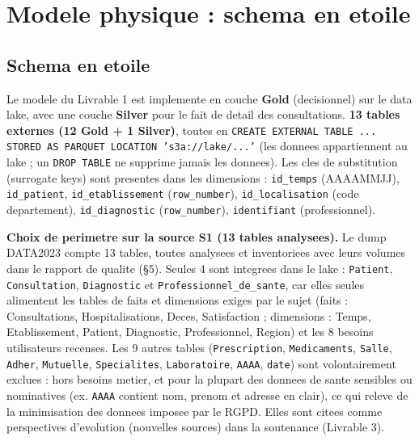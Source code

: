 \documentclass[11pt,a4paper]{article}
\begin{document}
\section{Modele physique : schema en etoile}

\subsection{Schema en etoile}
Le modele du Livrable 1 est implemente en couche \textbf{Gold} (decisionnel) sur
le data lake, avec une couche \textbf{Silver} pour le fait de detail des
consultations. \textbf{13 tables externes (12 Gold + 1 Silver)}, toutes en
\texttt{CREATE EXTERNAL TABLE ... STORED AS PARQUET LOCATION 's3a://lake/...'}
(les donnees appartiennent au lake ; un \texttt{DROP TABLE} ne supprime jamais
les donnees). Les cles de substitution (surrogate keys) sont presentes dans les
dimensions : \texttt{id\_temps} (AAAAMMJJ), \texttt{id\_patient},
\texttt{id\_etablissement} (\texttt{row\_number}), \texttt{id\_localisation}
(code departement), \texttt{id\_diagnostic} (\texttt{row\_number}),
\texttt{identifiant} (professionnel).

\medskip
\textbf{Choix de perimetre sur la source S1 (13 tables analysees).} Le dump
DATA2023 compte 13 tables, toutes analysees et inventoriees avec leurs volumes
dans le rapport de qualite (\S5). Seules 4 sont integrees dans le lake :
\texttt{Patient}, \texttt{Consultation}, \texttt{Diagnostic} et
\texttt{Professionnel\_de\_sante}, car elles seules alimentent les tables de
faits et dimensions exiges par le sujet (faits : Consultations, Hospitalisations,
Deces, Satisfaction ; dimensions : Temps, Etablissement, Patient, Diagnostic,
Professionnel, Region) et les 8 besoins utilisateurs recenses. Les 9 autres
tables (\texttt{Prescription}, \texttt{Medicaments}, \texttt{Salle},
\texttt{Adher}, \texttt{Mutuelle}, \texttt{Specialites}, \texttt{Laboratoire},
\texttt{AAAA}, \texttt{date}) sont volontairement exclues : hors besoins metier,
et pour la plupart des donnees de sante sensibles ou nominatives (ex.
\texttt{AAAA} contient nom, prenom et adresse en clair), ce qui releve de la
minimisation des donnees imposee par le RGPD. Elles sont citees comme
perspectives d'evolution (nouvelles sources) dans la soutenance (Livrable 3).
\end{document}
